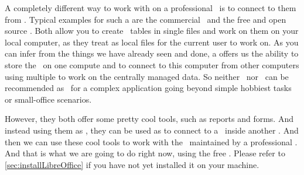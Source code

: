 %
%
%
A completely different way to work with  on a professional \dbms\ is to connect to them from .
Typical examples for such a  are the commercial \microsoftAccess\ and the free and open source \libreofficeBase.
Both allow you to create \db\ tables in single files and work on them on your local computer, as they treat  as local files for the current user to work on.
As you can infer from the things we have already seen and done, a  offers us the ability to store the \db\ on one compute and to connect to this computer from other computers using multiple  to work on the centrally managed data.
So neither \microsoftAccess\ nor \libreofficeBase\ can be recommended as \dbms\ for a complex application going beyond simple hobbiest tasks or small-office scenarios.

However, they both offer some pretty cool tools, such as reports and forms.
And instead using them as \dbms, they can be used as  to connect to a \db\ inside another \dbms.
And then we can use these cool tools to work with the \db\ maintained by a professional \dbms.
And that is what we are going to do right now, using the free \libreofficeBase.
Please refer to \cref{sec:installLibreOffice} if you have not yet installed it on your machine.%
%
\FloatBarrier%
%
%
%
%
%
%
%
%
\FloatBarrier%
\endhsection%
%
